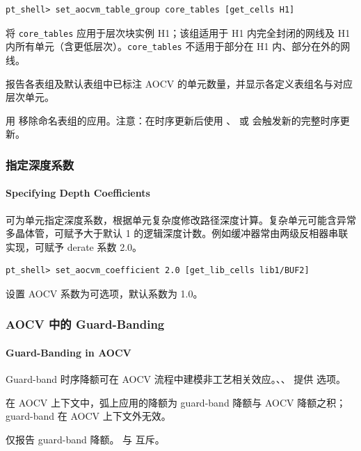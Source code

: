 \begin{lstlisting}
pt_shell> set_aocvm_table_group core_tables [get_cells H1]
\end{lstlisting}

将 \texttt{core\_tables} 应用于层次块实例 H1；该组适用于 H1 内完全封闭的网线及 H1 内所有单元（含更低层次）。\texttt{core\_tables} 不适用于部分在 H1 内、部分在外的网线。

 报告各表组及默认表组中已标注 AOCV 的单元数量，并显示各定义表组名与对应层次单元。

用  移除命名表组的应用。注意：在时序更新后使用 、 或  会触发新的完整时序更新。

\subsubsection{指定深度系数}
\paragraph*{Specifying Depth Coefficients}

可为单元指定深度系数，根据单元复杂度修改路径深度计算。复杂单元可能含异常多晶体管，可赋予大于默认 1 的逻辑深度计数。例如缓冲器常由两级反相器串联实现，可赋予 derate 系数 2.0。

\begin{lstlisting}
pt_shell> set_aocvm_coefficient 2.0 [get_lib_cells lib1/BUF2]
\end{lstlisting}

设置 AOCV 系数为可选项，默认系数为 1.0。

\subsubsection{AOCV 中的 Guard-Banding}
\paragraph*{Guard-Banding in AOCV}

Guard-band 时序降额可在 AOCV 流程中建模非工艺相关效应。、、 提供  选项。

在 AOCV 上下文中，弧上应用的降额为 guard-band 降额与 AOCV 降额之积；guard-band 在 AOCV 上下文外无效。

 仅报告 guard-band 降额。 与  互斥。

